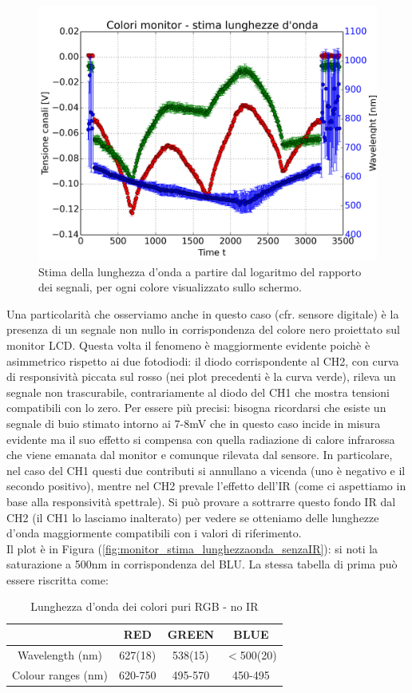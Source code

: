 \documentclass[10pt,letterpaper]{article}
\begin{document}
\begin{figure}
\centering
\includegraphics[width=0.7\linewidth]{./monitor_stima_lunghezzaonda}
\caption{Stima della lunghezza d'onda a partire dal logaritmo del rapporto dei segnali, per ogni colore visualizzato sullo schermo.}
\label{fig:monitor_stima_lunghezzaonda}
\end{figure}

Una particolarità che osserviamo anche in questo caso (cfr. sensore digitale) è la presenza di un segnale non nullo in corrispondenza del colore nero proiettato sul monitor LCD. Questa volta il fenomeno è maggiormente evidente poichè è asimmetrico rispetto ai due fotodiodi: il diodo corrispondente al CH2, con curva di responsività piccata sul rosso (nei plot precedenti è la curva verde), rileva un segnale non trascurabile, contrariamente al diodo del CH1 che mostra tensioni compatibili con lo zero. Per essere più precisi: bisogna ricordarsi che esiste un segnale di buio stimato intorno ai 7-8mV che in questo caso incide in misura evidente ma il suo effetto si compensa con quella radiazione di calore infrarossa che viene emanata dal monitor e comunque rilevata dal sensore. In particolare, nel caso del CH1 questi due contributi si annullano a vicenda (uno è negativo e il secondo positivo), mentre nel CH2 prevale l'effetto dell'IR (come ci aspettiamo in base alla responsività spettrale). Si può provare a sottrarre questo fondo IR dal CH2 (il CH1 lo lasciamo inalterato) per vedere se otteniamo delle lunghezze d'onda maggiormente compatibili con i valori di riferimento. \\
Il plot è in Figura (\ref{fig:monitor_stima_lunghezzaonda_senzaIR}): si noti la saturazione a 500nm in corrispondenza del BLU. La stessa tabella di prima può essere riscritta come:

\begin{table}[h]
\centering
\begin{tabular}{c|c|c|c}
  & \textbf{RED} & \textbf{GREEN} & \textbf{BLUE} \\ 
 \hline Wavelength (nm) & 627(18) & 538(15) & $<$500(20) \\
 Colour ranges (nm) & 620-750 & 495-570 & 450-495 \\ 
\hline 
\end{tabular} 
\caption{Lunghezza d'onda dei colori puri RGB - no IR}
\label{RGB_lambda_noIR}
\end{table}
~\\
\end{document}
